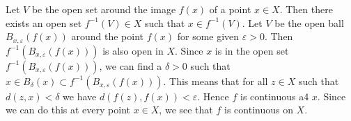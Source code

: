 
\begin{solution}
    Let $V$ be the open set around the image $f(x)$ of a
    point $x\in X$. Then there exists an open set $f^{-1}
    (V)\in X$ such that $x\in f^{-1}(V)$.
    Let $V$ be the open ball
    $B_{x,\varepsilon}(f(x))$ around the point $f(x)$
    for some given $\varepsilon>0$.
    Then $f^{-1}(B_{x,\varepsilon}(f(x)))$ is also open in
    $X$. Since $x$ is in the open set
    $f^{-1}(B_{x,\varepsilon}(f(x)))$, we can find a
    $\delta>0$ such that $x\in B_\delta(x)\subset
    f^{-1}(B_{x,\varepsilon}(f(x)))$. This means that
    for all $z\in X$ such that
    $d(z,x)<\delta$ we have $d(f(z),f(x))<\varepsilon$.
    Hence $f$ is continuous a4 $x$. Since we can
    do this at every point $x\in X$, we see that $f$ is
    continuous on $X$.
\end{solution}